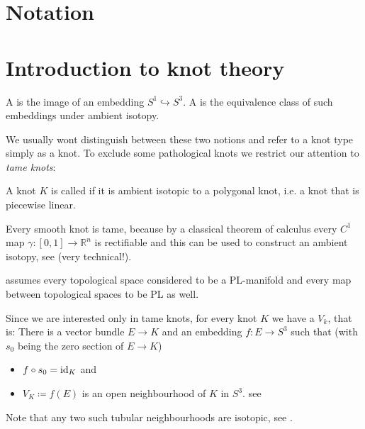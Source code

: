 
% 





\tableofcontents

\tableofcontents
\section*{Notation}

\cleardoubleoddemptypage%

\setcounter{page}{1}
\setcounter{footnote}{0}

\section{Introduction to knot theory} %
\label{sec:intro_knots}

\begin{definition}
	A  is the image of an embedding $S^1 \hookrightarrow S^3$.
	A  is the equivalence class of such embeddings under ambient isotopy.
\end{definition}

We usually wont distinguish between these two notions and refer to a knot type simply as a knot.
To exclude some pathological knots we restrict our attention to \emph{tame knots}:

\begin{definition}
	A knot $K$ is called  if it is ambient isotopic to a polygonal knot, i.e. a knot that is piecewise linear.
\end{definition}

\begin{example}
	Every smooth knot is tame, because by a classical theorem of calculus every $C^1$ map $\gamma \colon [0,1] \to \mathbb{R}^n$ is rectifiable and this can be used to construct an ambient isotopy, see \textcite[Appendix I.]{introduction-knots} (very technical!).
\end{example}

\textcite[p.~9]{morishita} assumes every topological space considered to be a PL-manifold and every map between topological spaces to be PL as well.

Since we are interested only in tame knots, for every knot $K$ we have a  $V_k$, that is: There is a vector bundle $E \to K$ and an embedding $f \colon E \to S^3$ such that (with $s_0$ being the zero section of $E \to K$)
\begin{itemize}
	\item $f \circ s_0 = {\operatorname{id}_K}$ and
	\item $V_K \coloneqq f(E)$ is an open neighbourhood of $K$ in $S^3$. \hfill see \textcite{hirschDifferential}
\end{itemize}
Note that any two such tubular neighbourhoods are isotopic, see \textcite[Chap.~4, Thm.~5.3]{hirschDifferential}.


